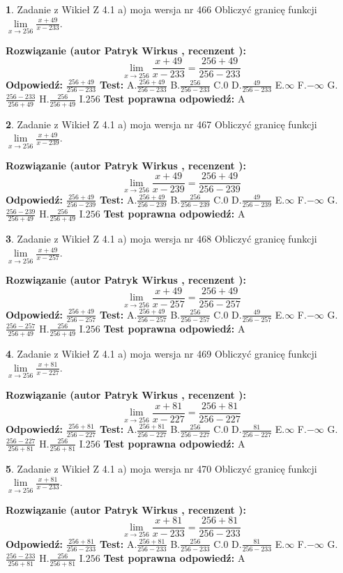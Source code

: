 \documentclass[12pt, a4paper]{article}
\theoremstyle{definition} %
\newtheorem{zad}{}
\newcommand{\zadStart}[1]{\begin{zad}#1\newline}
\newcommand{\zadStop}{\end{zad}}
\newcommand{\rozwStart}[2]{\noindent \textbf{Rozwiązanie (autor #1 , recenzent #2): }\newline}
\newcommand{\rozwStop}{\newline}
\newcommand{\odpStart}{\noindent \textbf{Odpowiedź:}\newline}
\newcommand{\odpStop}{\newline}
\newcommand{\testStart}{\noindent \textbf{Test:}\newline}
\newcommand{\testStop}{\newline}
\newcommand{\kluczStart}{\noindent \textbf{Test poprawna odpowiedź:}\newline}
\newcommand{\kluczStop}{\newline}
\begin{document}
\zadStart{Zadanie z Wikieł Z 4.1 a) moja wersja nr 466}
Obliczyć granicę funkcji $\lim\limits_{x\to256}\frac{x+49}{x-233}$.
\zadStop
\rozwStart{Patryk Wirkus}{}
$$\lim\limits_{x\to256}\frac{x+49}{x-233} = \frac{256+49}{256-233}$$
\rozwStop
\odpStart
$\frac{256+49}{256-233}$
\odpStop
\testStart
A.$\frac{256+49}{256-233}$
B.$\frac{256}{256-233}$
C.$0$
D.$\frac{49}{256-233}$
E.$\infty$
F.$-\infty$
G.$\frac{256-233}{256+49}$
H.$\frac{256}{256+49}$
I.$256$
\testStop
\kluczStart
A
\kluczStop



\zadStart{Zadanie z Wikieł Z 4.1 a) moja wersja nr 467}
Obliczyć granicę funkcji $\lim\limits_{x\to256}\frac{x+49}{x-239}$.
\zadStop
\rozwStart{Patryk Wirkus}{}
$$\lim\limits_{x\to256}\frac{x+49}{x-239} = \frac{256+49}{256-239}$$
\rozwStop
\odpStart
$\frac{256+49}{256-239}$
\odpStop
\testStart
A.$\frac{256+49}{256-239}$
B.$\frac{256}{256-239}$
C.$0$
D.$\frac{49}{256-239}$
E.$\infty$
F.$-\infty$
G.$\frac{256-239}{256+49}$
H.$\frac{256}{256+49}$
I.$256$
\testStop
\kluczStart
A
\kluczStop



\zadStart{Zadanie z Wikieł Z 4.1 a) moja wersja nr 468}
Obliczyć granicę funkcji $\lim\limits_{x\to256}\frac{x+49}{x-257}$.
\zadStop
\rozwStart{Patryk Wirkus}{}
$$\lim\limits_{x\to256}\frac{x+49}{x-257} = \frac{256+49}{256-257}$$
\rozwStop
\odpStart
$\frac{256+49}{256-257}$
\odpStop
\testStart
A.$\frac{256+49}{256-257}$
B.$\frac{256}{256-257}$
C.$0$
D.$\frac{49}{256-257}$
E.$\infty$
F.$-\infty$
G.$\frac{256-257}{256+49}$
H.$\frac{256}{256+49}$
I.$256$
\testStop
\kluczStart
A
\kluczStop



\zadStart{Zadanie z Wikieł Z 4.1 a) moja wersja nr 469}
Obliczyć granicę funkcji $\lim\limits_{x\to256}\frac{x+81}{x-227}$.
\zadStop
\rozwStart{Patryk Wirkus}{}
$$\lim\limits_{x\to256}\frac{x+81}{x-227} = \frac{256+81}{256-227}$$
\rozwStop
\odpStart
$\frac{256+81}{256-227}$
\odpStop
\testStart
A.$\frac{256+81}{256-227}$
B.$\frac{256}{256-227}$
C.$0$
D.$\frac{81}{256-227}$
E.$\infty$
F.$-\infty$
G.$\frac{256-227}{256+81}$
H.$\frac{256}{256+81}$
I.$256$
\testStop
\kluczStart
A
\kluczStop



\zadStart{Zadanie z Wikieł Z 4.1 a) moja wersja nr 470}
Obliczyć granicę funkcji $\lim\limits_{x\to256}\frac{x+81}{x-233}$.
\zadStop
\rozwStart{Patryk Wirkus}{}
$$\lim\limits_{x\to256}\frac{x+81}{x-233} = \frac{256+81}{256-233}$$
\rozwStop
\odpStart
$\frac{256+81}{256-233}$
\odpStop
\testStart
A.$\frac{256+81}{256-233}$
B.$\frac{256}{256-233}$
C.$0$
D.$\frac{81}{256-233}$
E.$\infty$
F.$-\infty$
G.$\frac{256-233}{256+81}$
H.$\frac{256}{256+81}$
I.$256$
\testStop
\kluczStart
A
\kluczStop
\end{document}
